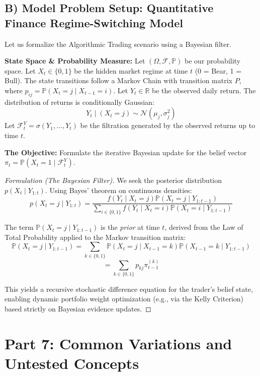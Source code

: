 \documentclass[12pt]{article}
\theoremstyle{definition}
\theoremstyle{remark}
\newcommand{\Pbb}{\mathbb{P}}
\newcommand{\Fcal}{\mathcal{F}}
\newcommand{\OmegaSet}{\Omega}
\begin{document}
\subsection{B) Model Problem Setup: Quantitative Finance Regime-Switching Model}
Let us formalize the Algorithmic Trading scenario using a Bayesian filter.

\textbf{State Space & Probability Measure:} 
Let $(\OmegaSet, \Fcal, \Pbb)$ be our probability space. Let $X_t \in \{0, 1\}$ be the hidden market regime at time $t$ (0 = Bear, 1 = Bull). The state transitions follow a Markov Chain with transition matrix $P$, where $p_{ij} = \Pbb(X_t = j \mid X_{t-1} = i)$.
Let $Y_t \in \mathbb{R}$ be the observed daily return. The distribution of returns is conditionally Gaussian:
\[ Y_t \mid (X_t = j) \sim \mathcal{N}(\mu_j, \sigma_j^2) \]
Let $\Fcal_t^Y = \sigma(Y_1, \dots, Y_t)$ be the filtration generated by the observed returns up to time $t$. 

\textbf{The Objective:} Formulate the iterative Bayesian update for the belief vector $\pi_t = \Pbb(X_t = 1 \mid \Fcal_t^Y)$.

\begin{proof}[Formulation (The Bayesian Filter)]
We seek the posterior distribution $p(X_t \mid Y_{1:t})$. Using Bayes' theorem on continuous densities:
\[ p(X_t = j \mid Y_{1:t}) = \frac{f(Y_t \mid X_t = j) \Pbb(X_t = j \mid Y_{1:t-1})}{\sum_{i \in \{0,1\}} f(Y_t \mid X_t = i) \Pbb(X_t = i \mid Y_{1:t-1})} \]

The term $\Pbb(X_t = j \mid Y_{1:t-1})$ is the \textit{prior} at time $t$, derived from the Law of Total Probability applied to the Markov transition matrix:
\[ \Pbb(X_t = j \mid Y_{1:t-1}) = \sum_{k \in \{0,1\}} \Pbb(X_t = j \mid X_{t-1} = k) \Pbb(X_{t-1} = k \mid Y_{1:t-1}) \]
\[ = \sum_{k \in \{0,1\}} p_{kj} \pi_{t-1}^{(k)} \]

This yields a recursive stochastic difference equation for the trader's belief state, enabling dynamic portfolio weight optimization (e.g., via the Kelly Criterion) based strictly on Bayesian evidence updates.
\end{proof}

\newpage
\section{Part 7: Common Variations and Untested Concepts}
\end{document}
